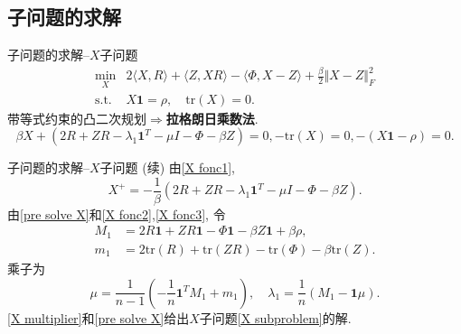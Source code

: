 \documentclass{beamer}
\newcommand{\trace}{\mathrm{tr}}
\newcommand{\st}{\mathrm{s.t.}}
\newcommand{\one}{\mathbf{1}}
\begin{document}
\subsection{子问题的求解}
\begin{frame}{子问题的求解--$X$子问题}
\begin{equation}
	\begin{array}{rl}
		\min\limits_X & 2\langle X,R\rangle+\langle Z,XR\rangle-\langle\Phi,X-Z\rangle+\frac{\beta}{2}\Vert X-Z\Vert_F^2\\
		\st & X\one=\rho,\quad\trace(X)=0.
	\end{array}
	\label{X subproblem}
\end{equation}
带等式约束的凸二次规划\pause$\Rightarrow$\textbf{拉格朗日乘数法}.
\begin{subequations}
	\begin{equation}
	\beta X+(2R+ZR-\lambda_1\one^T-\mu I-\Phi-\beta Z)=0,\label{X fonc1}
	\end{equation}
	\begin{equation}
	-\trace(X)=0,\label{X fonc2}
	\end{equation}
	\begin{equation}
	-(X\one-\rho)=0.\label{X fonc3}
	\end{equation}
\end{subequations}
\end{frame}

\begin{frame}{子问题的求解--$X$子问题 (续)}
由\eqref{X fonc1}, 
\begin{equation}
	X^+=-\frac{1}{\beta}(2R+ZR-\lambda_1\one^T-\mu I-\Phi-\beta Z).\label{pre solve X}
\end{equation}
由\eqref{pre solve X}和\eqref{X fonc2},\eqref{X fonc3}, 令
$$\begin{aligned}
	M_1&=2R\one+ZR\one-\Phi\one-\beta Z\one+\beta\rho,\\
	m_1&=2\trace(R)+\trace(ZR)-\trace(\Phi)-\beta\trace(Z).
\end{aligned}$$
乘子为
\begin{equation}
	\mu=\frac{1}{n-1}\left(-\frac{1}{n}\one^TM_1+m_1\right),\quad\lambda_1=\frac{1}{n}(M_1-\one\mu).\label{X multiplier}
\end{equation}
\eqref{X multiplier}和\eqref{pre solve X}给出$X$子问题\eqref{X subproblem}的解.
\end{frame}
\end{document}
